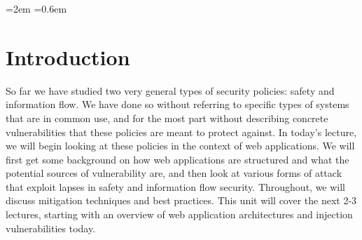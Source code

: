 \documentclass[11pt,twoside]{scrartcl}
\begin{document}
\newcommand{\atrace}{\omega}%
\newcommand{\stdI}{\dTLint[state=\omega]}%
\newcommand{\Ip}{\dTLint[trace=\atrace]}%
\newcommand{\ws}{\omega}\newcommand{\wt}{\nu}%

\newdimen{\linferenceRulehskipamount}
\linferenceRulehskipamount=2em
  \linferenceRulevskipamount=0.6em


\lstset{escapechar=@,style=customc}

\maketitle
\thispagestyle{empty}


\section{Introduction}

So far we have studied two very general types of security policies: safety and information flow. We have done so without referring to specific types of systems that are in common use, and for the most part without describing concrete vulnerabilities that these policies are meant to protect against. In today's lecture, we will begin looking at these policies in the context of web applications. We will first get some background on how web applications are structured and what the potential sources of vulnerability are, and then look at various forms of attack that exploit lapses in safety and information flow security. Throughout, we will discuss mitigation techniques and best practices. This unit will cover the next 2-3 lectures, starting with an overview of web application architectures and injection vulnerabilities today.
\end{document}
